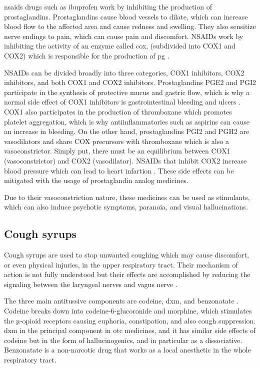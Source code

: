 \gls{nsaids} drugs such as ibuprofen work by inhibiting the production of prostaglandins. Prostaglandins cause blood vessels to dilate, which can increase blood flow to the affected area and cause redness and swelling. They also sensitize nerve endings to pain, which can cause pain and discomfort. NSAIDs work by inhibiting the activity of an enzyme called \gls{cox}, (subdivided into COX1 and COX2) which is responsible for the production of \gls{pg} \cite{Faki2021}.

NSAIDs can be divided broadly into three categories, COX1 inhibitors, COX2 inhibitors, and both COX1 and COX2 inhibitors. Prostaglandins PGE2 and PGI2 participate in the synthesis of protective mucus and gastric flow, which is why a normal side effect of COX1 inhibitors is gastrointestinal bleeding and ulcers \cite{Faki2021}. COX1 also participates in the production of thromboxane which promotes platelet aggregation, which is why antiinflammatories such as aspirins can cause an increase in bleeding. On the other hand, prostaglandins PGI2 and PGH2 are vasodilators and share COX precursors with thromboxane which is also a vasoconstrictor. Simply put, there must be an equilibrium between COX1 (vasoconstrictor) and COX2 (vasodilator). NSAIDs that inhibit COX2 increase blood pressure which can lead to heart infartion \cite{Faki2021}. These side effects can be mitigated with the usage of prostaglandin analog medicines.

Due to their vasoconstriction nature, these medicines can be used as stimulants, which can also induce psychotic symptoms, paranoia, and visual hallucinations. \cite{otcAbuse2020}

\subsection{Cough syrups}

Cough syrups are used to stop unwanted coughing which may cause discomfort, or even physical injuries, in the upper respiratory tract. Their mechanism of action is not fully understood but their effects are accomplished by reducing the signaling between the laryngeal nerves and vagus nerve \cite{Bardal2011}.

The three main antitussive components are codeine, \gls{dxm}, and benzonatate \cite{Beharry2016}. Codeine breaks down into codeine-6-glucoronide and morphine, which stimulates the µ-opioid receptors \cite{Schulz2004} causing euphoria, constipation, and also cough suppression. \gls{dxm} in the principal component in \gls{otc} medicines, and it has similar side effects of codeine but in the form of hallucinogenics, and in particular as a dissociative. Benzonatate is a non-narcotic drug that works as a local anesthetic in the whole respiratory tract. 


